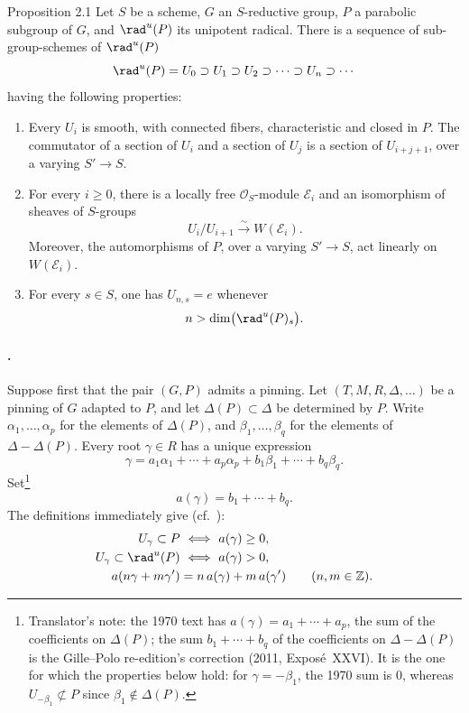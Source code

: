 
\begin{sgastatement}{Proposition 2.1}
Let \(S\) be a scheme, \(G\) an \(S\)-reductive group, \(P\) a parabolic
subgroup of \(G\), and \(\rad^u(P)\) its unipotent radical.  There is a
sequence of sub-group-schemes of \(\rad^u(P)\)
\[
 \rad^u(P)=U_0\supset U_1\supset U_2\supset\cdots
 \supset U_n\supset\cdots
\]
having the following properties:
\begin{enumerate}[label=\textup{(\roman*)}]
\item Every \(U_i\) is smooth, with connected fibers, characteristic and
closed in \(P\).  The commutator of a section of \(U_i\) and a section of
\(U_j\) is a section of \(U_{i+j+1}\), over a varying \(S'\to S\).
\item For every \(i\geq0\), there is a locally free
\(\mathcal O_S\)-module \(\mathcal E_i\) and an isomorphism of sheaves of
\(S\)-groups
\[
 U_i/U_{i+1}\xrightarrow{\sim}W(\mathcal E_i).
\]
Moreover, the automorphisms of \(P\), over a varying \(S'\to S\), act
linearly on \(W(\mathcal E_i)\).
\item For every \(s\in S\), one has \(U_{n,s}=e\) whenever
\[
 n>\dim\bigl(\rad^u(P)_s\bigr).
\]
\end{enumerate}
\end{sgastatement}

\paragraph{.}
Suppose first that the pair \((G,P)\) admits a pinning.  Let
\((T,M,R,\Delta,\ldots)\) be a pinning of \(G\) adapted to \(P\), and let
\(\Delta(P)\subset\Delta\) be determined by \(P\).  Write
\(\alpha_1,\ldots,\alpha_p\) for the elements of \(\Delta(P)\), and
\(\beta_1,\ldots,\beta_q\) for the elements of
\(\Delta-\Delta(P)\).  Every root \(\gamma\in R\) has a unique expression
\[
 \gamma
 =a_1\alpha_1+\cdots+a_p\alpha_p
  +b_1\beta_1+\cdots+b_q\beta_q.
\]
Set\footnote{Translator's note: the 1970 text has
\(a(\gamma)=a_1+\cdots+a_p\), the sum of the coefficients on \(\Delta(P)\);
the sum \(b_1+\cdots+b_q\) of the coefficients on \(\Delta-\Delta(P)\) is the
Gille--Polo re-edition's correction (2011, Exposé~XXVI). It is the one for
which the properties below hold: for \(\gamma=-\beta_1\), the 1970 sum is
\(0\), whereas \(U_{-\beta_1}\not\subset P\) since \(\beta_1\notin\Delta(P)\).}
\[
 a(\gamma)=b_1+\cdots+b_q.
\]
The definitions immediately give (cf.\ ):
\[
\begin{aligned}
 U_\gamma\subset P
   &\ \Longleftrightarrow\ a(\gamma)\geq0,\\
 U_\gamma\subset\rad^u(P)
   &\ \Longleftrightarrow\ a(\gamma)>0,\\
 a(n\gamma+m\gamma')
   &=n\,a(\gamma)+m\,a(\gamma')
   \qquad(n,m\in\mathbb Z).
\end{aligned}
\]

